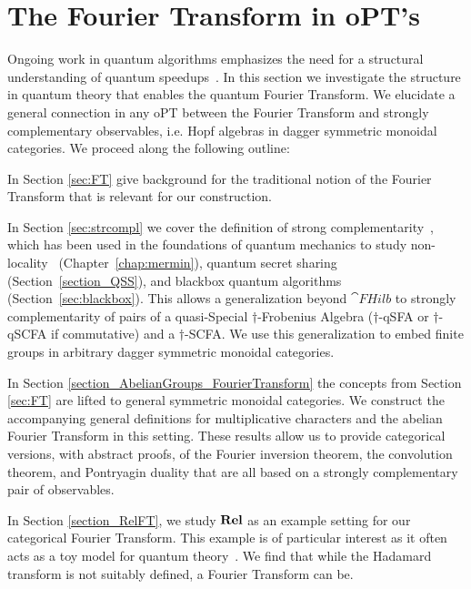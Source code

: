 \section{The Fourier Transform in oPT's}
\label{sec:strcomplFT}

Ongoing work in quantum algorithms emphasizes the need for a structural understanding of quantum speedups~\cite{aaronson2014need}. In this section we investigate the structure in quantum theory that enables the quantum Fourier Transform. We elucidate a general connection in any oPT between the Fourier Transform and strongly complementary observables, i.e. Hopf algebras in dagger symmetric monoidal categories. We proceed along the following outline:

In Section \ref{sec:FT} give background for the traditional notion of the Fourier Transform that is relevant for our construction.  

In Section \ref{sec:strcompl} we cover the definition of strong complementarity~\cite{coecke2011interacting}, which has been used in the foundations of quantum mechanics to study non-locality~\cite{coecke2012strong, gogioso2015mermin} (Chapter~\ref{chap:mermin}), quantum secret sharing~\cite{gogioso2015mermin, zamdzhiev2012abstract} (Section~\ref{section_QSS}), and blackbox quantum algorithms~\cite{vicary-tqa, zeng2014abstract, zeng2015models} (Section~\ref{sec:blackbox}). This allows a generalization beyond $\cat{FHilb}$ to strongly complementarity of pairs of a quasi-Special $\dagger$-Frobenius Algebra ($\dagger$-qSFA or $\dagger$-qSCFA if commutative) and a $\dagger$-SCFA. We use this generalization to embed finite groups in arbitrary dagger symmetric monoidal categories.

In Section \ref{section_AbelianGroups_FourierTransform} the concepts from Section \ref{sec:FT} are lifted to general symmetric monoidal categories. We construct the accompanying general definitions for multiplicative characters and the abelian Fourier Transform in this setting.  These results allow us to provide categorical versions, with abstract proofs, of the Fourier inversion theorem, the convolution theorem, and Pontryagin duality that are all based on a strongly complementary pair of observables.

In Section \ref{section_RelFT}, we study $\mathbf{Rel}$ as an example setting for our categorical Fourier Transform. This example is of particular interest as it often acts as a toy model for quantum theory~\cite{evans2009classifying, cqm-notes, pavlovic2009quantum, zeng2015models}.  We find that while the Hadamard transform is not suitably defined, a Fourier Transform can be.


